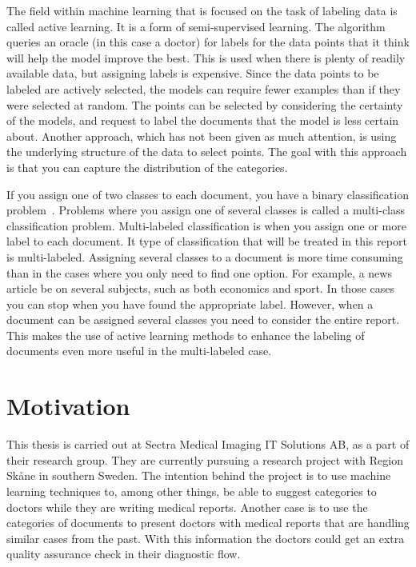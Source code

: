 The field within machine learning that is focused on the task of labeling data is called active learning.
It is a form of semi-supervised learning.
The algorithm queries an oracle (in this case a doctor) for labels for the data points that it think will help the model improve the best.
This is used when there is plenty of readily available data, but assigning labels is expensive.
Since the data points to be labeled are actively selected, the models can require fewer examples than if they were selected at random.
The points can be selected by considering the certainty of the models, and request to label the documents that the model is less certain about.
Another approach, which has not been given as much attention, is using the underlying structure of the data to select points.
The goal with this approach is that you can capture the distribution of the categories.

If you assign one of two classes to each document, you have a binary classification problem~\cite{bishop2006pattern}.
Problems where you assign one of several classes is called a multi-class classification problem.
Multi-labeled classification is when you assign one or more label to each document.
It type of classification that will be treated in this report is multi-labeled.
Assigning several classes to a document is more time consuming than in the cases where you only need to find one option.
For example, a news article be on several subjects, such as both economics and sport.
In those cases you can stop when you have found the appropriate label.
However, when a document can be assigned several classes you need to consider the entire report.
This makes the use of active learning methods to enhance the labeling of documents even more useful in the multi-labeled case.

\section{Motivation}
\label{sec:motivation}

This thesis is carried out at Sectra Medical Imaging IT Solutions AB, as a part of their research group.
They are currently pursuing a research project with Region Skåne in southern Sweden.
The intention behind the project is to use machine learning techniques to, among other things, be able to suggest categories to doctors while they are writing medical reports.
Another case is to use the categories of documents to present doctors with medical reports that are handling similar cases from the past.
With this information the doctors could get an extra quality assurance check in their diagnostic flow.

